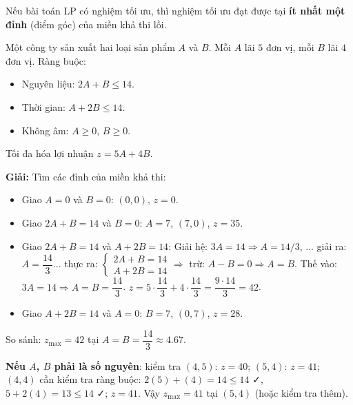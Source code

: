 \documentclass[12pt,a4paper]{article}
\begin{document}
\begin{dinhly}[title={Định lý điểm cực (Corner Point Theorem)}]
  Nếu bài toán LP có nghiệm tối ưu, thì nghiệm tối ưu đạt được tại \textbf{ít nhất một đỉnh} (điểm góc) của miền khả thi lồi.
\end{dinhly}

\begin{vidu}
  Một công ty sản xuất hai loại sản phẩm $A$ và $B$. Mỗi $A$ lãi $5$ đơn vị, mỗi $B$ lãi $4$ đơn vị. Ràng buộc:
  \begin{itemize}
    \item Nguyên liệu: $2A + B \le 14$.
    \item Thời gian: $A + 2B \le 14$.
    \item Không âm: $A \ge 0$, $B \ge 0$.
  \end{itemize}
  Tối đa hóa lợi nhuận $z = 5A + 4B$.

  \medskip\textbf{Giải:}
  Tìm các đỉnh của miền khả thi:
  \begin{itemize}
    \item Giao $A=0$ và $B=0$: $(0,0)$, $z=0$.
    \item Giao $2A+B=14$ và $B=0$: $A=7$, $(7,0)$, $z=35$.
    \item Giao $2A+B=14$ và $A+2B=14$: Giải hệ: $3A=14 \Rightarrow A=14/3$, ... giải ra: $A=\dfrac{14}{3}$... thực ra:
      $\begin{cases}2A+B=14\\A+2B=14\end{cases} \Rightarrow$ trừ: $A-B=0 \Rightarrow A=B$. Thế vào: $3A=14 \Rightarrow A=B=\dfrac{14}{3}$. $z = 5\cdot\dfrac{14}{3}+4\cdot\dfrac{14}{3} = \dfrac{9\cdot14}{3} = 42$.
    \item Giao $A+2B=14$ và $A=0$: $B=7$, $(0,7)$, $z=28$.
  \end{itemize}

  So sánh: $z_{\max} = 42$ tại $A = B = \dfrac{14}{3} \approx 4.67$.

  \textbf{Nếu $A$, $B$ phải là số nguyên}: kiểm tra $(4,5)$: $z=40$; $(5,4)$: $z=41$; $(4,4)$ cần kiểm tra ràng buộc: $2(5)+(4)=14\le14$ ✓, $5+2(4)=13\le14$ ✓; $z=41$. Vậy $z_{\max}=41$ tại $(5,4)$ (hoặc kiểm tra thêm).
\end{vidu}
\end{document}
